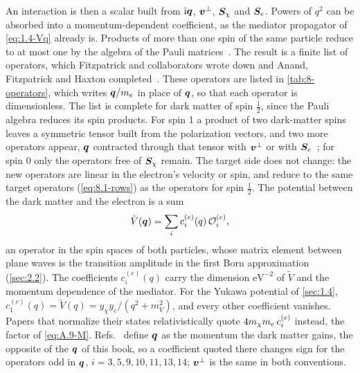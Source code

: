An interaction is then a scalar built from $\mathrm{i}\bm{q}$, $\bm{v}^\perp$, $\bm{S}_\chi$ and $\bm{S}_e$. Powers of $q^2$ can be absorbed into a momentum-dependent coefficient, as the mediator propagator of \cref{eq:1.4-Vq} already is. Products of more than one spin of the same particle reduce to at most one by the algebra of the Pauli matrices~\cite[Sect.~2.2]{fitzpatrick2013effective}. The result is a finite list of operators, which Fitzpatrick and collaborators wrote down and Anand, Fitzpatrick and Haxton completed~\cites[Eqs.~(19)--(24) and (45)]{fitzpatrick2013effective}[Eqs.~(12) and (13)]{anand2014model}. These operators are listed in \cref{tab:8-operators}, which writes $\bm{q}/m_e$ in place of $\bm{q}$, so that each operator is dimensionless. The list is complete for dark matter of spin $\frac12$, since the Pauli algebra reduces its spin products. For spin 1 a product of two dark-matter spins leaves a symmetric tensor built from the polarization vectors, and two more operators appear, $\bm{q}$ contracted through that tensor with $\bm{v}^\perp$ or with $\bm{S}_e$~\cite[Eq.~(18)]{dent2015general}; for spin 0 only the operators free of $\bm{S}_\chi$ remain. The target side does not change: the new operators are linear in the electron's velocity or spin, and reduce to the same target operators (\cref{eq:8.1-rows}) as the operators for spin $\frac12$. The potential between the dark matter and the electron is a sum
\begin{equation}
  \tilde V(\bm{q}) = \sum_i c_i^{(e)}(q)\,\mathcal{O}_i^{(e)} ,
  \label{eq:8.1-eft}
\end{equation}
an operator in the spin spaces of both particles, whose matrix element between plane waves is the transition amplitude in the first Born approximation (\cref{sec:2.2}). The coefficients $c_i^{(e)}(q)$ carry the dimension $\mathrm{eV}^{-2}$ of $\tilde V$ and the momentum dependence of the mediator. For the Yukawa potential of \cref{sec:1.4}, $c_1^{(e)}(q) = \tilde V(q) = y_\chi y_e/(q^2 + m_V^2)$, and every other coefficient vanishes. Papers that normalize their states relativistically quote $4m_{\chi} m_e\,c_i^{(e)}$ instead, the factor of \cref{eq:A.9-M}. Refs.~\cite{fitzpatrick2013effective,anand2014model} define $\bm{q}$ as the momentum the dark matter gains, the opposite of the $\bm{q}$ of this book, so a coefficient quoted there changes sign for the operators odd in $\bm{q}$, $i = 3, 5, 9, 10, 11, 13, 14$; $\bm{v}^\perp$ is the same in both conventions.

